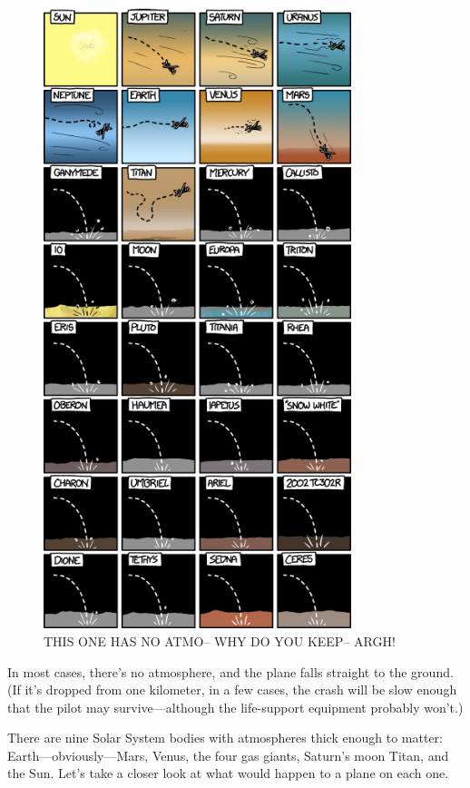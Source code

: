 \begin{figure}[!htbp]
\centering
\includegraphics[scale=0.5, max width=0.8\textwidth]{imgs/a/30/cessna_results.png}
\caption{THIS ONE HAS NO ATMO-- WHY DO YOU KEEP-- ARGH!}
\end{figure}

{In most cases, there’s no atmosphere, and the plane falls straight to the ground. (If it’s dropped from one kilometer, in a few cases, the crash will be slow enough that the pilot may survive—although the life-support equipment probably won’t.)}

{There are nine Solar System bodies with atmospheres thick enough to matter: Earth—obviously—Mars, Venus, the four gas giants, Saturn’s moon Titan, and the Sun. Let’s take a closer look at what would happen to a plane on each one.}

